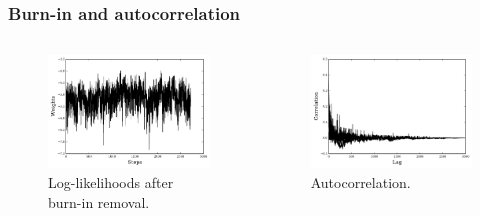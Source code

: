 \documentclass{beamer}
\begin{document}


\iffalse

\begin{frame}
\frametitle{Burn-in and autocorrelation}
\begin{columns}[c] %
\begin{figure}
\includegraphics[width=1.1\linewidth]{weights_example.pdf}
\caption{Log-likelihoods after burn-in removal.}
\end{figure}
\begin{figure}
\includegraphics[width=1.1\linewidth]{ac_fpol.pdf}
\caption{Autocorrelation.}
\end{figure}
\end{columns}

\end{frame}
\end{document}
